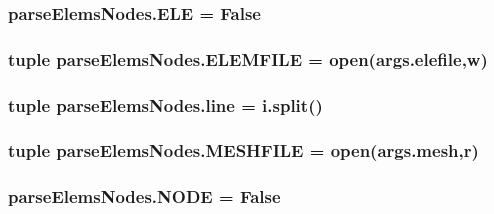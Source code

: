 \subsubsection[{E\+L\+E}]{\setlength{\rightskip}{0pt plus 5cm}parse\+Elems\+Nodes.\+E\+L\+E = False}\label{namespaceparseElemsNodes_aa07c055475a83647de8806433f7f265c}
\hypertarget{namespaceparseElemsNodes_aeb290ae55bba5b8886f86f4c27eb6487}{}
\subsubsection[{E\+L\+E\+M\+F\+I\+L\+E}]{\setlength{\rightskip}{0pt plus 5cm}tuple parse\+Elems\+Nodes.\+E\+L\+E\+M\+F\+I\+L\+E = open(args.\+elefile,\textquotesingle{}w\textquotesingle{})}\label{namespaceparseElemsNodes_aeb290ae55bba5b8886f86f4c27eb6487}
\hypertarget{namespaceparseElemsNodes_a0409c90a612f75ca8a96b04f30c3af99}{}
\subsubsection[{line}]{\setlength{\rightskip}{0pt plus 5cm}tuple parse\+Elems\+Nodes.\+line = i.\+split()}\label{namespaceparseElemsNodes_a0409c90a612f75ca8a96b04f30c3af99}
\hypertarget{namespaceparseElemsNodes_adce8ae499592f36beedd7667957eaa5a}{}
\subsubsection[{M\+E\+S\+H\+F\+I\+L\+E}]{\setlength{\rightskip}{0pt plus 5cm}tuple parse\+Elems\+Nodes.\+M\+E\+S\+H\+F\+I\+L\+E = open(args.\+mesh,\textquotesingle{}r\textquotesingle{})}\label{namespaceparseElemsNodes_adce8ae499592f36beedd7667957eaa5a}
\hypertarget{namespaceparseElemsNodes_af0b0d9d032d7fce7e3c0c1e3468b46ef}{}
\subsubsection[{N\+O\+D\+E}]{\setlength{\rightskip}{0pt plus 5cm}parse\+Elems\+Nodes.\+N\+O\+D\+E = False}\label{namespaceparseElemsNodes_af0b0d9d032d7fce7e3c0c1e3468b46ef}
\hypertarget{namespaceparseElemsNodes_a63635a902bbe24578f2c3769b65741b8}{}
